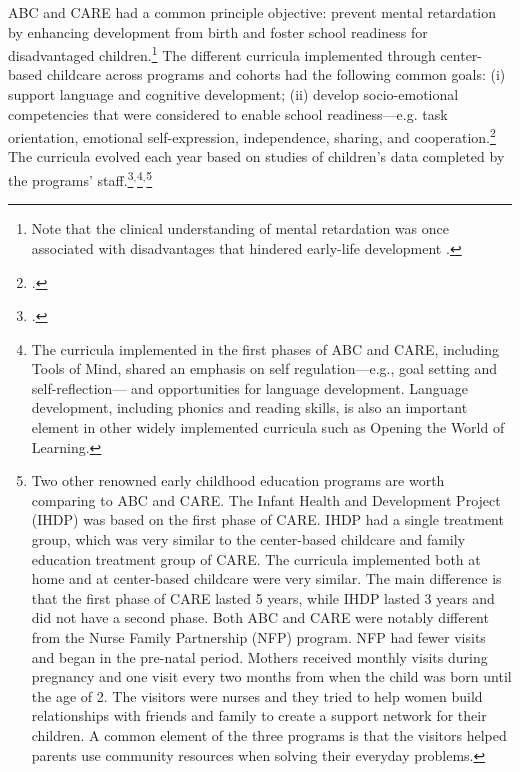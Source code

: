 \noindent ABC and CARE had a common principle objective: prevent mental retardation by enhancing development from birth and foster school readiness for disadvantaged children.\footnote{Note that the clinical understanding of mental retardation was once associated with disadvantages that hindered early-life development \citep{Mental-Retardation_America_2004_BOOK_NYU}.} The different curricula implemented through center-based childcare across programs and cohorts had the following common goals: (i) support language and cognitive development; (ii) develop socio-emotional competencies that were considered to enable school readiness---e.g. task orientation, emotional self-expression, independence, sharing, and cooperation.\footnote{\citet{Sparling_1974_Synth_Edu_Infant_SPEECH,Ramey_Collier_etal_1976_CarolinaAbecedarianProject,Ramey-etal_2012-ABC}.} The curricula evolved each year based on studies of children's data completed by the programs' staff.\footnote{\citet{Ramey-etal_1975_AJoMD,Finkelstein_1982_Day_Care_YC,Haskins_1985_CD}.}$^{,}$\footnote{The curricula implemented in the first phases of ABC and CARE, including Tools of Mind, shared an emphasis on self regulation---e.g., goal setting and self-reflection--- and opportunities for language development. Language development, including phonics and reading skills, is also an important element in other widely implemented curricula such as Opening the World of Learning.}$^{,}$\footnote{Two other renowned early childhood education programs are worth comparing to ABC and CARE. The Infant Health and Development Project (IHDP) was based on the first phase of CARE. IHDP had a single treatment group, which was very similar to the center-based childcare and family education treatment group of CARE. The curricula implemented both at home and at center-based childcare were very similar. The main difference is that the first phase of CARE lasted 5 years, while IHDP lasted 3 years and did not have a second phase. Both ABC and CARE were notably different from the Nurse Family Partnership (NFP) program. NFP had fewer visits and began in the pre-natal period. Mothers received monthly visits during pregnancy and one visit every two months from when the child was born until the age of 2. The visitors were nurses and they tried to help women build relationships with friends and family to create a support network for their children. A common element of the three programs is that the visitors helped parents use community resources when solving their everyday problems.}\\

